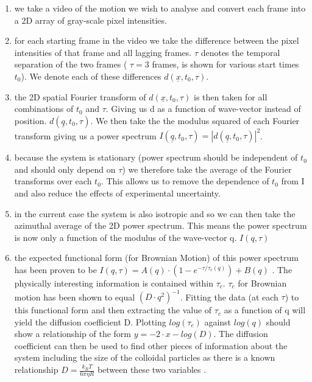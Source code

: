 \documentclass[11pt]{article}
\begin{document}
\begin{enumerate}[label=\alph*]
\item we take a video of the motion we wish to analyse and convert each frame into a 2D array of gray-scale pixel intensities.
\item for each starting frame in the video we take the difference between the pixel intensities of that frame and all lagging frames. $ \tau $ 
denotes the temporal separation of the two frames ( $ \tau = 3 $ frames,  is shown for various start times $ t_0 $). We denote each of these differences $ d(\underline{x}, t_0, \tau) $.
\item the 2D spatial Fourier transform of $ d(\underline{x}, t_0, \tau) $ is then taken for all combinations of $ t_0 $ and $ \tau $. Giving us d as a function of wave-vector instead of position. $ d(\underline{q}, t_0, \tau) $. We then take the the modulus squared of each Fourier transform giving us a power spectrum $I(\underline{q}, t_0, \tau) = |d(\underline{q}, t_0, \tau)|^2$.
\item because the system is stationary (power spectrum should be independent of $t_0$ and should only depend on $\tau$) we therefore take the average of the Fourier transforms over each $t_0$. This allows us to remove the dependence of $t_0$ from I and also reduce the effects of experimental uncertainty.
\item in the current case the system is also isotropic and so we can then take the azimuthal average of the 2D power spectrum. This means the power spectrum is now only a function of the modulus of the wave-vector q. $I(q, \tau)$
\item the expected functional form (for Brownian Motion) of this power spectrum has been proven to be $I(q, \tau) = A(q) \cdot (1 - e^{-\tau / \tau_c (q)}) + B(q)$ \cite{DLSPecora}. The physically interesting information is contained within $\tau_c$. $\tau_c$ for Brownian motion has been shown to equal $(D \cdot q^2)^{-1}$. Fitting the data (at each $\tau$) to this functional form and then extracting the value of $\tau_c$ as a function of q will yield the diffusion coefficient D. Plotting $log(\tau_c)$ against $log(q)$ should show a relationship of the form $y = -2\cdot x - log(D)$. The diffusion coefficient can then be used to find other pieces of information about the system including the size of the colloidal particles as there is a known relationship $D=\frac{k_B T}{6 \pi \eta R}$ between these two variables \cite{wynot_2002}.
\end{enumerate}
\end{document}
